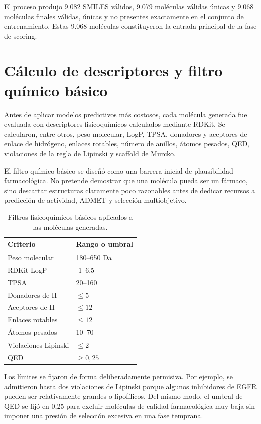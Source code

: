 \documentclass[IB]{TFUOC}%
\begin{document}
El proceso produjo 9.082 SMILES válidos, 9.079 moléculas válidas únicas y 9.068 moléculas finales válidas, únicas y no presentes exactamente en el conjunto de entrenamiento. Estas 9.068 moléculas constituyeron la entrada principal de la fase de scoring.

\section{Cálculo de descriptores y filtro químico básico}

Antes de aplicar modelos predictivos más costosos, cada molécula generada fue evaluada con descriptores fisicoquímicos calculados mediante RDKit. Se calcularon, entre otros, peso molecular, LogP, TPSA, donadores y aceptores de enlace de hidrógeno, enlaces rotables, número de anillos, átomos pesados, QED, violaciones de la regla de Lipinski y scaffold de Murcko.

El filtro químico básico se diseñó como una barrera inicial de plausibilidad farmacológica. No pretende demostrar que una molécula pueda ser un fármaco, sino descartar estructuras claramente poco razonables antes de dedicar recursos a predicción de actividad, ADMET y selección multiobjetivo.

\begin{table}[H]
    \centering
    \small
    \begin{tabular}{p{5cm} p{5cm}}
        \hline
        \textbf{Criterio} & \textbf{Rango o umbral} \\
        \hline
        Peso molecular & 180--650 Da \\
        RDKit LogP & -1--6,5 \\
        TPSA & 20--160 \\
        Donadores de H & $\leq 5$ \\
        Aceptores de H & $\leq 12$ \\
        Enlaces rotables & $\leq 12$ \\
        Átomos pesados & 10--70 \\
        Violaciones Lipinski & $\leq 2$ \\
        QED & $\geq 0,25$ \\
        \hline
    \end{tabular}
    \caption{Filtros fisicoquímicos básicos aplicados a las moléculas generadas.}
    \label{tab:filtros_basicos}
\end{table}

Los límites se fijaron de forma deliberadamente permisiva. Por ejemplo, se admitieron hasta dos violaciones de Lipinski porque algunos inhibidores de EGFR pueden ser relativamente grandes o lipofílicos. Del mismo modo, el umbral de QED se fijó en 0,25 para excluir moléculas de calidad farmacológica muy baja sin imponer una presión de selección excesiva en una fase temprana.
\end{document}
